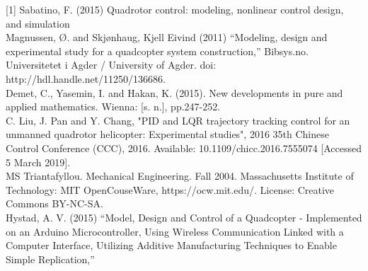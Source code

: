 [1] Sabatino, F. (2015) Quadrotor control: modeling, nonlinear control design, and simulation\\

\noindent
[2] Magnussen, Ø. and Skjønhaug, Kjell Eivind (2011) “Modeling, design and experimental study for a quadcopter system construction,” Bibsys.no. Universitetet i Agder / University of Agder. doi: http://hdl.handle.net/11250/136686.\\

\noindent
[3] Demet, C., Yasemin, I. and Hakan, K. (2015). New developments in pure and applied mathematics. Wienna: [s. n.], pp.247-252.\\

\noindent
[4] C. Liu, J. Pan and Y. Chang, "PID and LQR trajectory tracking control for an unmanned quadrotor helicopter: Experimental studies", 2016 35th Chinese Control Conference (CCC), 2016. Available: 10.1109/chicc.2016.7555074 [Accessed 5 March 2019].\\

\noindent
[5] MS Triantafyllou. Mechanical Engineering. Fall 2004. Massachusetts Institute of Technology: MIT OpenCouseWare, https://ocw.mit.edu/. License: Creative Commons BY-NC-SA.\\

\noindent
[6] Hystad, A. V. (2015) “Model, Design and Control of a Quadcopter - Implemented on an Arduino Microcontroller, Using Wireless Communication Linked with a Computer Interface, Utilizing Additive Manufacturing Techniques to Enable Simple Replication,”
